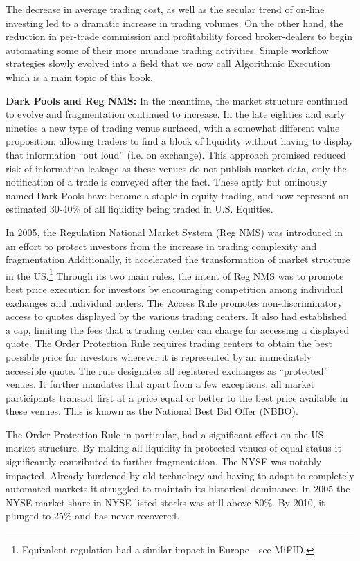 The decrease in average trading cost, as well as the secular trend of on-line investing led to a dramatic increase in trading volumes. On the other hand, the reduction in per-trade commission and profitability forced broker-dealers to begin automating some of their more mundane trading activities. Simple workflow strategies slowly evolved into a field that we now call Algorithmic Execution which is a main topic of this book. \twomedskip


\noindent\textbf{Dark Pools and Reg NMS:} \label{in:regnms} In the meantime, the market structure continued to evolve and fragmentation continued to increase. In the late eighties and early nineties a new type of trading venue surfaced, with a somewhat different value proposition: allowing traders to find a block of liquidity without having to display that information ``out loud'' (i.e. on exchange). This approach promised reduced risk of information leakage as these venues do not publish market data, only the notification of a trade is conveyed after the fact.  These aptly but ominously named Dark Pools have become a staple in equity trading, and now represent an estimated 30-40\% of all liquidity being traded in U.S. Equities. \twomedskip


In 2005, the Regulation National Market System (Reg NMS) was introduced in an effort to protect investors from the increase in trading complexity and fragmentation.Additionally, it accelerated the transformation of market structure in the US.\footnote{Equivalent regulation had a similar impact in Europe---see MiFID.} Through its two main rules, the intent of Reg NMS was to promote best price execution for investors by encouraging competition among individual exchanges and individual orders. The Access Rule promotes non-discriminatory access to quotes displayed by the various trading centers. It also had established a cap, limiting the fees that a trading center can charge for accessing a displayed quote. The Order Protection Rule requires trading centers to obtain the best possible price for investors wherever it is represented by an immediately accessible quote. The rule designates all registered exchanges as ``protected'' venues. It further mandates that apart from a few exceptions, all market participants transact first at a price equal or better to the best price available in these venues. This is known as the National Best Bid Offer (NBBO). 


The Order Protection Rule in particular, had a significant effect on the US market structure. By making all liquidity in protected venues of equal status it significantly contributed to further fragmentation. The NYSE was notably impacted. Already burdened by old technology and having to adapt to completely automated markets it struggled to maintain its historical dominance. In 2005 the NYSE market share in NYSE-listed stocks was  still above 80\%. By 2010, it plunged to 25\% and has never recovered.


